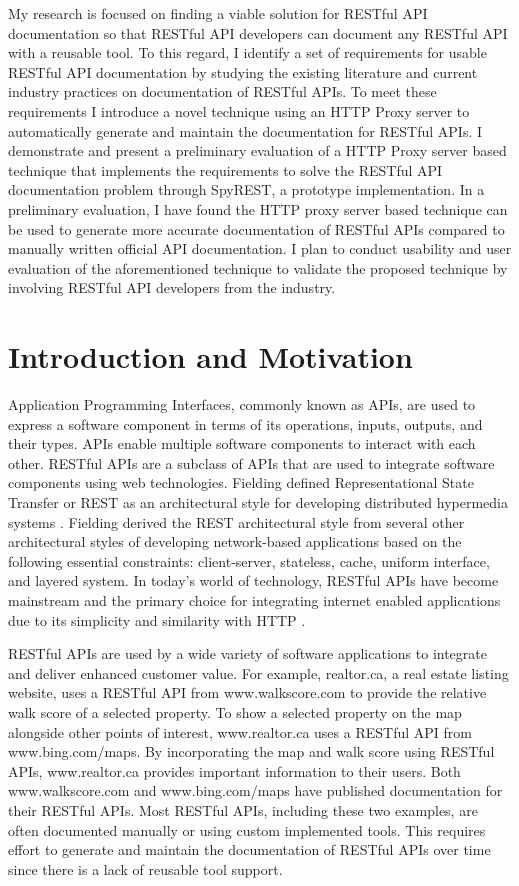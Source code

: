 \documentclass[11pt,oneside]{book}
\begin{document}
My research is focused on finding a viable solution for RESTful API documentation so that RESTful API developers can document any RESTful API with a reusable tool. To this regard, I identify a set of requirements for usable RESTful API documentation by studying the existing literature and current industry practices on documentation of RESTful APIs. To meet these requirements I introduce a novel technique using an HTTP Proxy server to automatically generate and maintain the documentation for RESTful APIs. I demonstrate and present a preliminary evaluation of a HTTP Proxy server based technique that implements the requirements to solve the RESTful API documentation problem through SpyREST, a prototype implementation. In a preliminary evaluation, I have found the HTTP proxy server based technique can be used to generate more accurate documentation of RESTful APIs compared to manually written official API documentation. I plan to conduct usability and user evaluation of the aforementioned technique to validate the proposed technique by involving RESTful API developers from the industry.

\section{Introduction and Motivation}

Application Programming Interfaces, commonly known as APIs, are used to express a software component in terms of its operations, inputs, outputs, and their types. APIs enable multiple software components to interact with each other. RESTful APIs are a subclass of APIs that are used to integrate software components using web technologies. Fielding defined Representational State Transfer or REST as an architectural style for developing distributed hypermedia systems \cite{Fielding_rest}. Fielding derived the REST architectural style from several other architectural styles of developing network-based applications based on the following essential constraints: client-server, stateless, cache, uniform interface, and layered system. In today’s world of technology, RESTful APIs have become mainstream and the primary choice for integrating internet enabled applications due to its simplicity and similarity with HTTP \cite{mangler2010origin}.

RESTful APIs are used by a wide variety of software applications to integrate and deliver enhanced customer value. For example, realtor.ca, a real estate listing website, uses a RESTful API from www.walkscore.com to provide the relative walk score of a selected property. To show a selected property on the map alongside other points of interest,  www.realtor.ca uses a RESTful API from www.bing.com/maps. By incorporating the map and walk score using RESTful APIs, www.realtor.ca provides important information to their users. Both www.walkscore.com and www.bing.com/maps have published documentation for their RESTful APIs. Most RESTful APIs, including these two examples, are often documented manually or using custom implemented tools. This requires effort to generate and maintain the documentation of RESTful APIs over time since there is a lack of reusable tool support.
\end{document}
